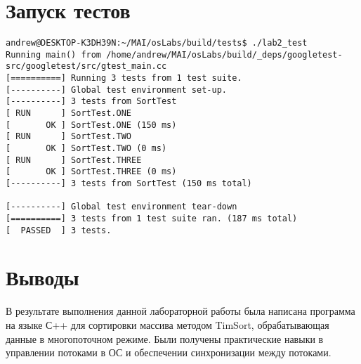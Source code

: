 \documentclass[a4paper, 12pt]{article}
\begin{document}
\newpage
\section{Запуск тестов}
\begin{verbatim}
andrew@DESKTOP-K3DH39N:~/MAI/osLabs/build/tests$ ./lab2_test 
Running main() from /home/andrew/MAI/osLabs/build/_deps/googletest-src/googletest/src/gtest_main.cc
[==========] Running 3 tests from 1 test suite.
[----------] Global test environment set-up.
[----------] 3 tests from SortTest
[ RUN      ] SortTest.ONE
[       OK ] SortTest.ONE (150 ms)
[ RUN      ] SortTest.TWO
[       OK ] SortTest.TWO (0 ms)
[ RUN      ] SortTest.THREE
[       OK ] SortTest.THREE (0 ms)
[----------] 3 tests from SortTest (150 ms total)

[----------] Global test environment tear-down
[==========] 3 tests from 1 test suite ran. (187 ms total)
[  PASSED  ] 3 tests.
\end{verbatim}
\newpage
\section{Выводы}
В результате выполнения данной лабораторной работы была написана программа на языке С++ для сортировки массива методом TimSort, обрабатывающая данные в многопоточном режиме. Были получены практические навыки в управлении потоками в ОС и обеспечении синхронизации между потоками.
\end{document}
